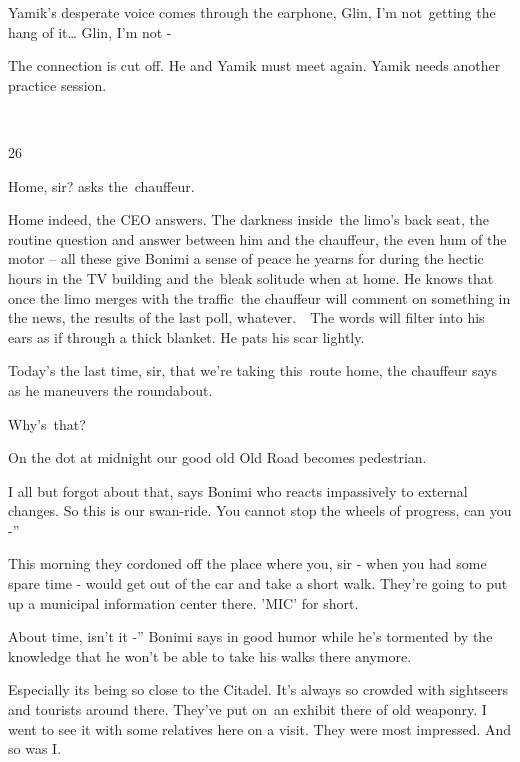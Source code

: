 \documentclass[twoside,11pt]{book}
\begin{document}
Yamik's desperate voice comes through the earphone, {\textquotedbl}Glin, I'm not~getting the hang of it{\dots} Glin, I'm
not {}-{\textquotedbl}

The connection is cut off. He and Yamik must meet again. Yamik needs another practice session. 

~

26

{\textquotedbl}Home, sir?{\textquotedbl} asks the~chauffeur. 

{\textquotedbl}Home indeed,{\textquotedbl} the CEO answers. The darkness inside{\ }the limo's back seat,
the routine question and answer between him and the chauffeur, the even hum of the motor -- all these give Bonimi a
sense of peace he yearns for during the hectic hours in the TV building and the{\ }bleak solitude when
at home. He knows that once the limo merges with the traffic~the chauffeur will comment on something in the news, the
results of the last poll, whatever.\ \ The words will filter into his ears as if through a thick blanket. He pats his
scar lightly.

{\textquotedbl}Today's the last time, sir, that we're taking this\ route home,{\textquotedbl} the chauffeur says as he
maneuvers the roundabout. 

{\textquotedbl}Why's\ that?{\textquotedbl} 

{\textquotedbl}On the dot at midnight our good old Old Road becomes pedestrian.{\textquotedbl} 

{\textquotedbl}I all but forgot about that,{\textquotedbl} says Bonimi who reacts impassively to external changes.
{\textquotedbl}So this is our swan-ride. You cannot stop the wheels of progress, can you -{}'' 

{\textquotedbl}This morning they cordoned off the place where you, sir - when you had some spare time - would get out of
the car and take a short walk. They're going to put up a municipal information center there. 'MIC' for
short.{\textquotedbl} 

{\textquotedbl}About time, isn't it -{}'' Bonimi says in good humor while he's tormented by the knowledge that he won't
be able to take his walks there anymore.\ {\ }

{\textquotedbl}Especially its being so close to the Citadel. It's always so crowded with sightseers and tourists around
there. They've put on~an exhibit there of old weaponry. I went to see it with some relatives here on a visit. They were
most impressed. And so was I.{\textquotedbl}\ 
\end{document}
